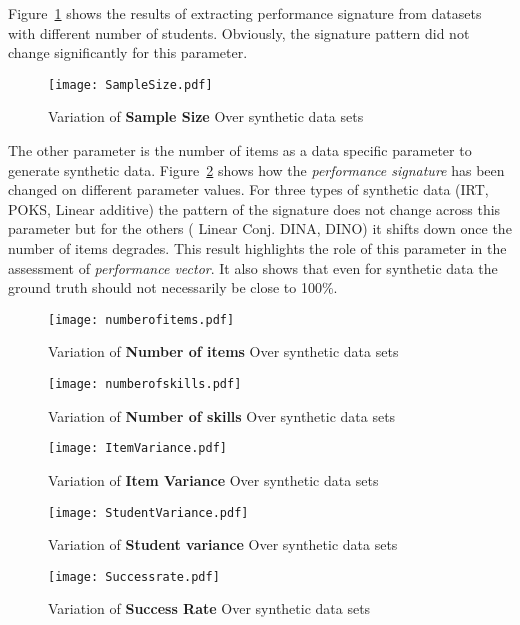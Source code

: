 Figure~\ref{figSampleSize} shows the results of extracting performance signature from datasets with different number of students. Obviously, the signature pattern did not change significantly for this parameter. 

\begin{figure}
  \centering

    \texttt{[image: SampleSize.pdf]}
     \caption{Variation of \textbf{Sample Size} Over synthetic data sets}
\label{figSampleSize}
\end{figure}


The other parameter is the number of items as a data specific parameter to generate synthetic data. Figure~\ref{figNumberofItems} shows how the \textit{performance signature} has been changed on different parameter values. For three types of synthetic data (IRT, POKS, Linear additive) the pattern of the signature does not change across this parameter but for the others ( Linear Conj. DINA, DINO) it shifts down once the number of items degrades. This result highlights the role of this parameter in the assessment of \textit{performance vector}. It also shows that even for synthetic data the ground truth should not necessarily be close to 100\%.

\begin{figure}
  \centering
    \texttt{[image: numberofitems.pdf]}
\caption{Variation of \textbf{Number of items} Over synthetic data sets}
\label{figNumberofItems}
\end{figure}

\begin{figure}
  \centering
    \texttt{[image: numberofskills.pdf]}
\caption{Variation of \textbf{Number of skills} Over synthetic data sets}
\label{figSkills}
\end{figure}

\begin{figure}
  \centering
    \texttt{[image: ItemVariance.pdf]}
\caption{Variation of \textbf{Item Variance} Over synthetic data sets}
\label{figitemVar}
\end{figure}

\begin{figure}
  \centering
    \texttt{[image: StudentVariance.pdf]}
\caption{Variation of \textbf{Student variance} Over synthetic data sets}
\label{figStudentVar}
\end{figure}


\begin{figure}
  \centering
    \texttt{[image: Successrate.pdf]}
\caption{Variation of \textbf{Success Rate} Over synthetic data sets}
\label{figSucceessRate}
\end{figure}


